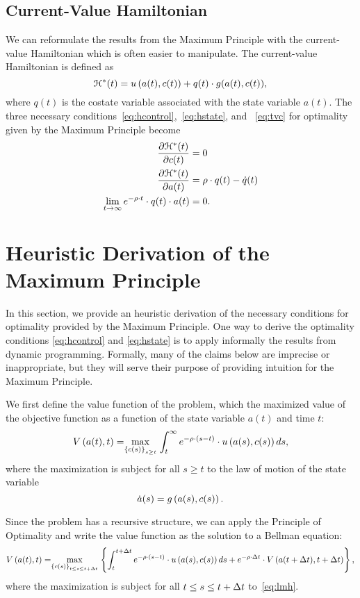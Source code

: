 \documentclass[letterpaper,12pt,leqno]{article}
\begin{document}
\subsection{Current-Value Hamiltonian}
We can reformulate the results from the Maximum Principle with the current-value Hamiltonian which is often easier to manipulate. The current-value Hamiltonian is defined as 
\begin{equation*}
\mathcal{H}^{*}(t)=  u\left( a(t),c(t) \right) +q(t)\cdot g(a(t),c(t)),
\end{equation*}
where $q(t)$ is the costate variable associated with the state variable $a(t)$.
The three necessary conditions~\eqref{eq:hcontrol},~\eqref{eq:hstate}, and ~\eqref{eq:tvc} for optimality given by the Maximum Principle become
\begin{align*}
\frac{\partial \mathcal{H}^{*}(t)}{\partial c(t)} &=0\\
\frac{\partial \mathcal{H}^{*}(t)}{\partial a(t)} &=\rho\cdot q(t)-\dot{q}(t)\\
\lim_{t\to \infty }e^{-\rho\cdot  t}\cdot q(t)\cdot a(t)&=0. 
\end{align*}


\section{Heuristic Derivation of the Maximum Principle}\label{sec:HEURISTIC}

In this section, we provide an heuristic derivation of the necessary conditions for optimality provided by the Maximum Principle. One way to derive the optimality conditions \eqref{eq:hcontrol} and \eqref{eq:hstate} is to apply informally the results from dynamic programming. Formally, many of the claims below are imprecise or inappropriate, but they will serve their purpose of providing intuition for the Maximum Principle.


We first define the value function of the problem, which the maximized value of the objective function as a function of the
state variable $a(t)$ and time $t$:
\begin{equation*}
V\bp{a(t),t} =\underset{\bc{c(s)}_{s\geq t}}{\max} \int_{t}^{\infty }e^{-\r \cdot \bp{s-t}}\cdot u\bp{a(s),c(s)} ds,
\end{equation*}
where the maximization is subject for all $s\geq t$ to the law of motion of the state variable
\begin{equation}
\dot{a}(s)=g\left( a(s),c(s) \right).\label{eq:lmh}
\end{equation}

Since the problem has a recursive structure, we can apply the Principle of Optimality and write the value function as the solution to a Bellman equation:
\begin{align*}
V\bp{ a(t),t} =\underset{\bc{c(s)}_{t\leq s\leq t+\D t}}{\max }\bc{\int_{t}^{t+\D t}e^{-\r \cdot \bp{ s-t}} \cdot u\bp{a(s),c(s)} ds+e^{-\r  \cdot \D t} \cdot V\bp{ a(t+\D t),t+\D t} },
\end{align*}
where the maximization is subject for all $t\leq s\leq t+\Delta t$ to~\eqref{eq:lmh}.
\end{document}

